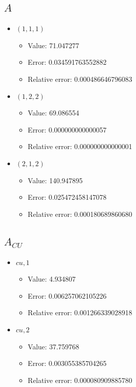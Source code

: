 \documentclass{article}%
\begin{document}
\subsection{$A$}%
\begin{itemize}%
	\item $(1, 1, 1)$%
	\begin{itemize}%
		\item Value: 71.047277%
		\item Error: 0.034591763552882%
		\item Relative error: 0.000486646796083%
	\end{itemize}%
	\item $(1, 2, 2)$%
	\begin{itemize}%
		\item Value: 69.086554%
		\item Error: 0.000000000000057%
		\item Relative error: 0.000000000000001%
	\end{itemize}%
	\item $(2, 1, 2)$%
	\begin{itemize}%
		\item Value: 140.947895%
		\item Error: 0.025472458147078%
		\item Relative error: 0.000180689860680%
	\end{itemize}%
\end{itemize}%
\subsection{$A_{CU}$}%
\begin{itemize}%
	\item $\textit{cu},1$%
	\begin{itemize}%
		\item Value: 4.934807%
		\item Error: 0.006257062105226%
		\item Relative error: 0.001266339028918%
	\end{itemize}%
	\item $\textit{cu},2$%
	\begin{itemize}%
		\item Value: 37.759768%
		\item Error: 0.003055385704265%
		\item Relative error: 0.000080909885780%
	\end{itemize}%
\end{itemize}%
\end{document}
